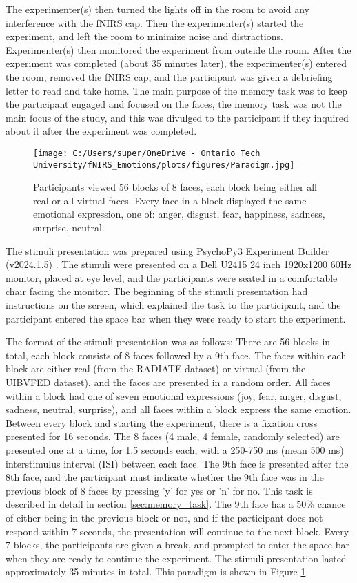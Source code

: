 The experimenter(s) then turned the lights off in the room to avoid any interference with the fNIRS cap. 
Then the experimenter(s) started the experiment, and left the room to minimize noise and distractions.
Experimenter(s) then monitored the experiment from outside the room. 
After the experiment was completed (about 35 minutes later), the experimenter(s) entered the room, removed the fNIRS cap, and the participant was given a debriefing letter to read and take home. 
The main purpose of the memory task was to keep the participant engaged and focused on the faces, the memory task was not the main focus of the study, and this was divulged to the participant if they inquired about it after the experiment was completed.

\begin{figure}[H]
    \centering
    \texttt{[image: C:/Users/super/OneDrive - Ontario Tech University/fNIRS\_Emotions/plots/figures/Paradigm.jpg]}
    \caption{Participants viewed 56 blocks of 8 faces, each block being either all real or all virtual faces.
    Every face in a block displayed the same emotional expression, one of: anger, disgust, fear, happiness, sadness, surprise, neutral. }
    \label{fig:paradigm}
\end{figure}

The stimuli presentation was prepared using PsychoPy3 Experiment Builder (v2024.1.5) \citep{peirce_psychopy2_2019}. 
The stimuli were presented on a Dell U2415 24 inch 1920x1200 60Hz monitor, placed at eye level, and the participants were seated in a comfortable chair facing the monitor.
The beginning of the stimuli presentation had instructions on the screen, which explained the task to the participant, and the participant entered the space bar when they were ready to start the experiment.

The format of the stimuli presentation was as follows: There are 56 blocks in total, each block consists of 8 faces followed by a 9th face.
The faces within each block are either real (from the RADIATE dataset) or virtual (from the UIBVFED dataset), and the faces are presented in a random order.
All faces within a block had one of seven emotional expressions (joy, fear, anger, disgust, sadness, neutral, surprise), and all faces within a block express the same emotion. 
Between every block and starting the experiment, there is a fixation cross presented for 16 seconds. 
The 8 faces (4 male, 4 female, randomly selected) are presented one at a time, for 1.5 seconds each, with a 250-750 ms (mean 500 ms) interstimulus interval (ISI) between each face. 
The 9th face is presented after the 8th face, and the participant must indicate whether the 9th face was in the previous block of 8 faces by pressing 'y' for yes or 'n' for no. 
This task is described in detail in section \ref{sec:memory_task}.
The 9th face has a 50\% chance of either being in the previous block or not, and if the participant does not respond within 7 seconds, the presentation will continue to the next block.
Every 7 blocks, the participants are given a break, and prompted to enter the space bar when they are ready to continue the experiment.
The stimuli presentation lasted approximately 35 minutes in total. 
This paradigm is shown in Figure \ref{fig:paradigm}.

